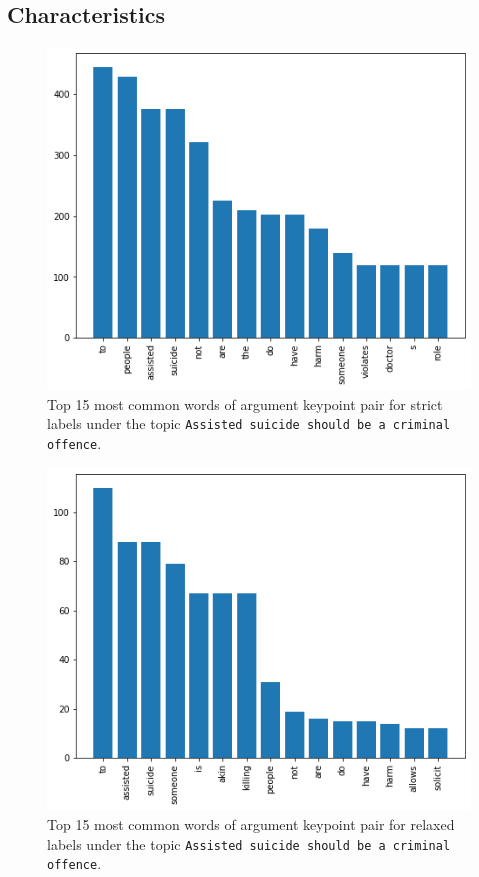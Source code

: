 \subsection{Characteristics}
\begin{figure}
	\caption{Top 15 most common words of argument keypoint pair for strict labels under the topic \texttt{Assisted suicide should be a criminal offence}.}
	\label{fig:stopwords-strict}
	\includegraphics[width=\linewidth]{figures/data_stopwords1.png}
\end{figure}
\begin{figure}
	\caption{Top 15 most common words of argument keypoint pair for relaxed labels under the topic \texttt{Assisted suicide should be a criminal offence}.}
	\label{fig:stopwords-relaxed}
	\includegraphics[width=\linewidth]{figures/data_stopwords2.png}
\end{figure}

